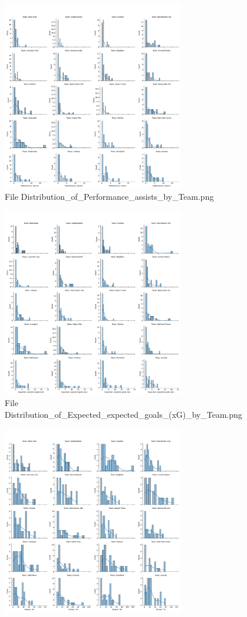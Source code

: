 \documentclass[12pt]{report}
\begin{document}
{\begin{figure}[h]
    \includegraphics[width=300px]{Distribution_of_Performance_assists_by_Team.png}
    \caption{File Distribution\_of\_Performance\_assists\_by\_Team.png}
    \label{fig:p3}
\end{figure}
\begin{figure}[h]
    \centering
    \includegraphics[width=300px]{Distribution_of_Expected_expected_goals_(xG)_by_Team.png}
    \caption{File Distribution\_of\_Expected\_expected\_goals\_(xG)\_by\_Team.png}
    \label{fig:p4}
\end{figure}
\begin{figure}[h]
    \centering
    \includegraphics[width=300px]{Distribution_of_Tackles_Tkl_by_Team.png}

\end{figure}}
\end{document}
